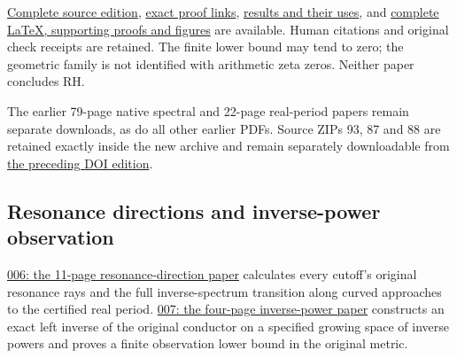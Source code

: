 \documentclass[
]{article}
\begin{document}
\href{https://github.com/KokunoYumeto/zeta-function-research-reader/blob/689a8f87e9c12b7a99b01b3123438c6751ee608f/workbenches/splitzero-tandem/continuations/20260921-directional-inverse-power/README.md}{Complete
source edition},
\href{https://github.com/KokunoYumeto/zeta-function-research-reader/blob/689a8f87e9c12b7a99b01b3123438c6751ee608f/workbenches/splitzero-tandem/continuations/20260921-directional-inverse-power/PROOF_LINKS.json}{exact
proof links},
\href{https://github.com/KokunoYumeto/zeta-function-research-reader/blob/689a8f87e9c12b7a99b01b3123438c6751ee608f/workbenches/splitzero-tandem/continuations/20260921-directional-inverse-power/RESULT_INDEX.json}{results
and their uses}, and
\href{https://zenodo.org/records/22865640/files/107-splitzero-directional-inverse-power-sources.zip?download=1}{complete
LaTeX, supporting proofs and figures} are available. Human citations and
original check receipts are retained. The finite lower bound may tend to
zero; the geometric family is not identified with arithmetic zeta zeros.
Neither paper concludes RH.

The earlier 79-page native spectral and 22-page real-period papers
remain separate downloads, as do all other earlier PDFs. Source ZIPs 93,
87 and 88 are retained exactly inside the new archive and remain
separately downloadable from
\href{https://zenodo.org/records/22865550}{the preceding DOI edition}.

\subsection{Resonance directions and inverse-power
observation}\label{resonance-directions-and-inverse-power-observation}

\href{https://github.com/KokunoYumeto/zeta-function-research-reader/blob/main/workbenches/splitzero-tandem/continuations/20260921-directional-inverse-power/006/REAL_PAIR_DIRECTIONAL_CONTINUATION.pdf}{006:
the 11-page resonance-direction paper} calculates every cutoff's
original resonance rays and the full inverse-spectrum transition along
curved approaches to the certified real period.
\href{https://github.com/KokunoYumeto/zeta-function-research-reader/blob/main/workbenches/splitzero-tandem/continuations/20260921-directional-inverse-power/007/Inverse_Power_Conductor_Observability_2026-09-21.pdf}{007:
the four-page inverse-power paper} constructs an exact left inverse of
the original conductor on a specified growing space of inverse powers
and proves a finite observation lower bound in the original metric.
\end{document}
